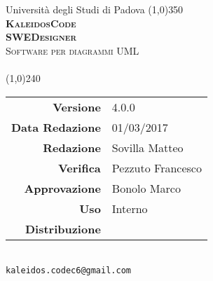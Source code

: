 \documentclass[a4paper,12pt]{article}
\author{KaleidosCode}
\date{03/03/2017}	%
\begin{document}
	\begin{titlepage}		
		\centering Università degli Studi di Padova
		\line(1,0){350}\\
		\vspace{0.4cm}
		{\bfseries\scshape\LARGE KaleidosCode\\}
		\vspace{0.4cm}
		{\bfseries\scshape\LARGE SWEDesigner\\}
		{\scshape\Large Software per diagrammi UML\\}
		\vspace{1cm}
		{\scshape\Large \normediprogettoi\ \\}		%
		\vspace{1.4cm}
		\logo
		\vspace{1.2cm}
		\line(1,0){240}\\
		\begin{tabular}{r|l}
			{\hfill \textbf{Versione}} 			& 4.0.0\\
			{\hfill \textbf{Data Redazione}} 	& 01/03/2017\\	%
			{\hfill \textbf{Redazione}} 		& Sovilla Matteo\\
			{\hfill \textbf{Verifica}} 			& Pezzuto Francesco\\
			{\hfill \textbf{Approvazione}} 		& Bonolo Marco\\
			{\hfill \textbf{Uso}} 				& Interno\\
			{\hfill \textbf{Distribuzione}} 	& \kaleidoscode\\
		\end{tabular}\\
		\vspace{2cm}
		\texttt{kaleidos.codec6@gmail.com}
	\end{titlepage}

	\pagestyle{myfront}
	\newpage
		
	\newpage
		\tableofcontents
	\newpage
		\listoffigures
	\newpage
	\pagestyle{mymain}
		
	\newpage
		
	\newpage
		
	\newpage
		
	\newpage
		
	\appendix
	\newpage
		
	\label{LastPage}
\end{document}
